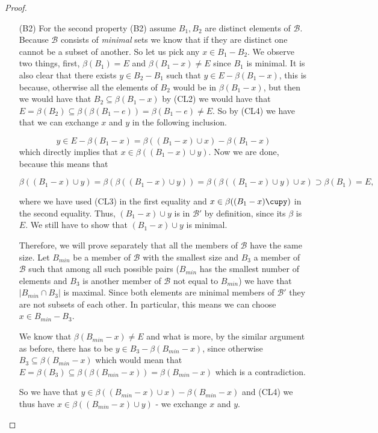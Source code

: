 \begin{proof}
\begin{enumerate}
\begin{enumerate}
\item[(B2)]
    For the second property (B2) assume $B_1, B_2$ are distinct elements of $\mathcal{B}.$ Because $\mathcal{B}$ consists of \textit{minimal} sets we know that if they are distinct one cannot be a subset of another. So let us pick any $x \in B_1 - B_2$.
    We observe two things, first, $\beta(B_1) = E$ and $\beta(B_1 - x) \neq E$ since $B_1$ is minimal. It is also clear that there exists $y \in B_2 - B_1$ such that $y \in E - \beta(B_1 - x)$, this is because, otherwise all the elements of $B_2$ would be in $\beta(B_1-x)$, but then we would have that $B_2 \subseteq \beta(B_1 - x)$ by (CL2) we would have that $E = \beta(B_2)\subseteq \beta(\beta(B_1 - e)) = \beta(B_1 - e) \neq E$. So by (CL4) we have that we can exchange $x$ and $y$ in the following inclusion.
    
    $$y \in E - \beta(B_1 - x) = \beta((B_1 -x )\cup x)-\beta(B_1 - x)$$ which directly implies that $x \in \beta((B_1 - x)\cup y)$. Now we are done, because this means that 
    
    $$\beta((B_1-x)\cup y) = \beta(\beta((B_1-x )\cup y)) = \beta(\beta((B_1 - x)\cup y)\cup x) \supset \beta(B_1) = E,$$
    
    
    where we have used (CL3) in the first equality and $x\in \beta((B_1-x)\cupy)$ in the second equality. Thus, $(B_1 - x) \cup y$ is in $\mathcal{B}'$ by definition, since its $\beta$ is $E$. We still have to show that $(B_1 - x)\cup y$ is minimal.
    
    Therefore, we will prove separately that all the members of $\mathcal{B}$ have the same size. Let $B_{min}$ be a member of $\mathcal{B}$ with the smallest size and $B_3$ a member of $\mathcal{B}$ such that among all such possible pairs ($B_{min}$ has the smallest number of elements and $B_3$ is another member of $\mathcal{B}$ not equal to $B_{min}$) we have that $|B_{min} \cap B_3|$ is maximal. Since both elements are minimal members of $\mathcal{B}'$ they are not subsets of each other. In particular, this means we can choose $x \in B_{min} - B_3$. 
    
    We know that $\beta(B_{min}-x) \neq E$ and what is more, by the similar argument as before, there has to be $y \in B_3 - \beta(B_{min} - x)$, since otherwise $B_3 \subseteq \beta(B_{min} - x)$ which would mean that $E = \beta(B_3)\subseteq \beta(\beta(B_{min}-x)) = \beta(B_{min} - x)$ which is a contradiction. 
    
    So we have that $y \in \beta((B_{min}-x)\cup x) - \beta(B_{min} -x)$ and (CL4) we thus have $x \in \beta((B_{min}-x)\cup y)$ - we exchange $x$ and $y$. 
    

\end{enumerate}
\end{enumerate}
\end{proof}
